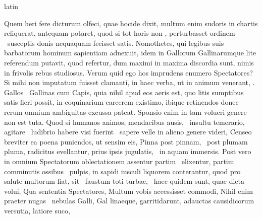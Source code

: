 \documentclass[12pt]{book}
\renewenvironment{latin}
    	{\begin{hyphenrules}{latin}}
    	{\end{hyphenrules}}
\begin{document}
\begin{pages}
\begin{latin}
\begin{Leftside}
                        Quem heri fere  dicturum olfeci, 
                        quae hocide dixit, multum enim sudoris in chartis reliquerat, 
                        antequam potaret, 
                        quod si tot horis non , 
                        perturbasset ordinem ﻿\ampersand\ susceptis donis nequaquam fecisset satis. 
                        Nomothetes, 
                        qui legibus suis barbatorum hominum sapientiam adnexuit, 
                        idem in Gallorum Gallinarumque lite referendum putavit, 
                        quod refertur, 
                        dum maximi  in maxima discordia sunt, nimis in frivolis rebus studiosus. 
                        Verum quid ego hos imprudens enumero Spectatores? 
                        Si mihi non imputatum fuisset  clamanti, in haec verba, 
                        ut in animum venerant, . 
                        Gallos ﻿\ampersand\ Gallinas cum Capis, 
                        quia nihil apud eos aeris est, 
                        quo litis sumptibus satis fieri possit, 
                        in coquinarium carcerem  existimo, 
                        ibique retinendos donec rerum omnium ambiguitas excussa pateat. 
                        Sponsio enim in tam volucri genere non est tuta. 
                        Quod si humanos animos, mendacibus ausis, ﻿\ampersand\ insultu temerario, agitare ﻿\ampersand\ ludibrio habere visi fuerint ﻿\ampersand\ sapere velle in alieno genere videri, 
                        Censeo breviter ea poena puniendos, 
                        ut sensim eis, Pinna post pinnam, ﻿\ampersand\ post plumam pluma, radicitus evellantur, prius ipsis jugulatis, ﻿\ampersand\ in  aquam immersis. 
                        Post vero in omnium Spectatorum oblectationem assentur partim ﻿\ampersand\ elixentur, 
                        partim comminutis ossibus ﻿\ampersand\ pulpis, in sapidi iusculi liquorem conterantur, 
                        quod pro salute multorum fiat, 
                         sit ﻿\ampersand\ faustum toti turbae, ﻿\ampersand\ haec quidem sunt, 
                        quae dicta volui, 
                        Qua sententia Spectatores, Multum vobis accessisset commodi, Nihil enim praeter nugas ﻿\ampersand\ nebulas Galli, Gal   linaeque, garritidarunt, adauctas causidicorum versutia, latiore suco, 

\end{Leftside}
\end{latin}
\end{pages}
\end{document}
